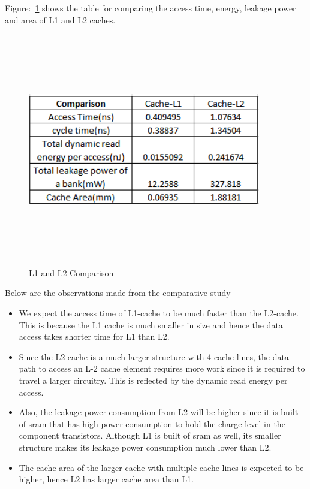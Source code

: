 \documentclass{tufte-handout}
\begin{document}
		Figure:~\ref{fig:L1L2Compare} shows the table for comparing the access time, energy, leakage power and area of L1 and L2 caches.
		\begin{figure}[h!]
		\label{fig:L1L2Compare}
		\centering
		\includegraphics[width = 4in, height = 4in]{L1L2Compare}
		\caption{L1 and L2 Comparison }
		\end{figure}

		Below are the observations made from the comparative study
		\begin{itemize}
			\item We expect the access time of L1-cache to be much faster than the L2-cache. This is because the L1 cache is much smaller in size and hence the data access takes shorter time for L1 than L2. 
			\item Since the L2-cache is a much larger structure with 4 cache lines, the data path to access an  L-2 cache element requires more work since it is required to travel a larger circuitry. This is reflected by the dynamic read energy per access.
			\item Also, the leakage power consumption from L2 will be higher since it is built of sram that has high power consumption to hold the charge level in the component transistors. Although L1 is built of sram as well, its smaller structure makes its leakage power consumption much lower than L2.
			\item The cache area of the larger cache with multiple cache lines is expected to be higher, hence L2 has larger cache area than L1.
		\end{itemize}
\end{document}
